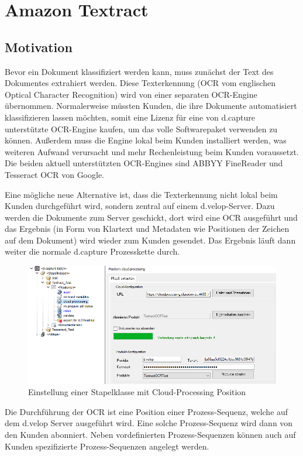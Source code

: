 \documentclass{whswinvcbook}
\begin{document}
\chapter{Amazon Textract}
\section{Motivation}
Bevor ein Dokument klassifiziert werden kann, muss zunächst der Text des Dokumentes extrahiert werden. Diese Texterkennung (OCR vom englischen Optical Character Recognition) wird von einer separaten OCR-Engine übernommen. Normalerweise müssten Kunden, die ihre Dokumente automatisiert klassifizieren lassen möchten, somit eine Lizenz für eine von d.capture unterstützte OCR-Engine kaufen, um das volle Softwarepaket verwenden zu können. Außerdem muss die Engine lokal beim Kunden installiert werden, was weiteren Aufwand verursacht und mehr Rechenleistung beim Kunden voraussetzt. Die beiden aktuell unterstützten OCR-Engines sind ABBYY FineReader und Tesseract OCR von Google.

Eine mögliche neue Alternative ist, dass die Texterkennung nicht lokal beim Kunden durchgeführt wird, sondern zentral auf einem d.velop-Server. Dazu werden die Dokumente zum Server geschickt, dort wird eine OCR ausgeführt und das Ergebnis (in Form von Klartext und Metadaten wie Positionen der Zeichen auf dem Dokument) wird wieder zum Kunden gesendet. Das Ergebnis läuft dann weiter die normale d.capture Prozesskette durch.
\begin{figure}[H]
    \centering
    \includegraphics[width=1.1\textwidth]{img/textract_cloudprocessing.png}
    \caption{Einstellung einer Stapelklasse mit Cloud-Processing Position}
    \label{fig-textract-cloudprocessing}
\end{figure}
Die Durchführung der OCR ist eine Position einer Prozess-Sequenz, welche auf dem d.velop Server ausgeführt wird. Eine solche Prozess-Sequenz wird dann von den Kunden abonniert. Neben vordefinierten Prozess-Sequenzen können auch auf Kunden spezifizierte Prozess-Sequenzen angelegt werden.
\end{document}
